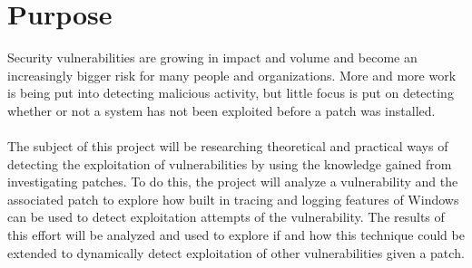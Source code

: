 \documentclass{report}
\begin{document}
\section{Purpose}
Security vulnerabilities are growing in impact and volume and become an increasingly bigger risk for many people and organizations. More and more work is being put into detecting malicious activity, but little focus is put on detecting whether or not a system has not been exploited before a patch was installed.
\\
\\
The subject of this project will be researching theoretical and practical ways of detecting the exploitation of vulnerabilities by using the knowledge gained from investigating patches. To do this, the project will analyze a vulnerability and the associated patch to explore how built in tracing and logging features of Windows can be used to detect exploitation attempts of the vulnerability. The results of this effort will be analyzed and used to explore if and how this technique could be extended to dynamically detect exploitation of other vulnerabilities given a patch.
\end{document}
